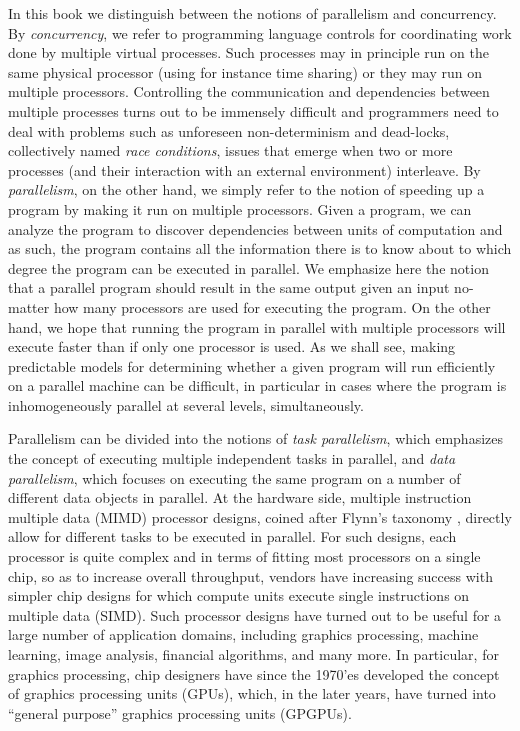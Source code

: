 \documentclass[oneside,11pt]{book}
\begin{document}
In this book we distinguish between the notions of parallelism and
concurrency. By \emph{concurrency}, we refer to programming language
controls for coordinating work done by multiple virtual
processes. Such processes may in principle run on the same physical
processor (using for instance time sharing) or they may run on
multiple processors. Controlling the communication and dependencies
between multiple processes turns out to be immensely difficult and
programmers need to deal with problems such as unforeseen
non-determinism and dead-locks, collectively named \emph{race
  conditions}, issues that emerge when two or more processes (and
their interaction with an external environment) interleave. By
\emph{parallelism}, on the other hand, we simply refer to the notion
of speeding up a program by making it run on multiple
processors. Given a program, we can analyze the program to discover
dependencies between units of computation and as such, the program
contains all the information there is to know about to which degree
the program can be executed in parallel. We emphasize here the notion
that a parallel program should result in the same output given an
input no-matter how many processors are used for executing the
program. On the other hand, we hope that running the program in
parallel with multiple processors will execute faster than if only one
processor is used. As we shall see, making predictable models for
determining whether a given program will run efficiently on a parallel
machine can be difficult, in particular in cases where the program is
inhomogeneously parallel at several levels, simultaneously.

Parallelism can be divided into the notions of \emph{task
  parallelism}, which emphasizes the concept of executing multiple
independent tasks in parallel, and \emph{data parallelism}, which
focuses on executing the same program on a number of different data
objects in parallel. At the hardware side, multiple instruction
multiple data (MIMD) processor designs, coined after Flynn's taxonomy
\cite{Flynn1972}, directly allow for different tasks to be executed in
parallel. For such designs, each processor is quite complex and in
terms of fitting most processors on a single chip, so as to increase
overall throughput, vendors have increasing success with simpler chip
designs for which compute units execute single instructions on
multiple data (SIMD). Such processor designs have turned out to be
useful for a large number of application domains, including graphics
processing, machine learning, image analysis, financial algorithms,
and many more. In particular, for graphics processing, chip designers
have since the 1970'es developed the concept of graphics processing
units (GPUs), which, in the later years, have turned into ``general
purpose'' graphics processing units (GPGPUs).
\end{document}
